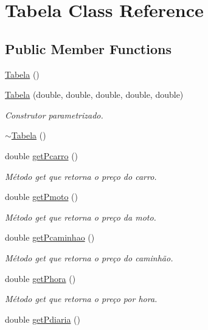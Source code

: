 \hypertarget{classTabela}{}\section{Tabela Class Reference}
\label{classTabela}
\subsection*{Public Member Functions}
\begin{DoxyCompactItemize}
\item 
\hyperlink{classTabela_ae631691131af52919f4b2e8bb823fde6}{Tabela} ()
\item 
\hyperlink{classTabela_acfefae7145c115e4b6ed3537e0cc2e4b}{Tabela} (double, double, double, double, double)
\begin{DoxyCompactList}\small\item\em Construtor parametrizado. \end{DoxyCompactList}\item 
\hyperlink{classTabela_ad3008f053777567e9b57174b93cfb7e2}{$\sim$\+Tabela} ()
\item 
double \hyperlink{classTabela_af8df006567638a44fec8e0951b794c4b}{get\+Pcarro} ()
\begin{DoxyCompactList}\small\item\em Método get que retorna o preço do carro. \end{DoxyCompactList}\item 
double \hyperlink{classTabela_a6f65feced705027c6c4d695737e1f7f4}{get\+Pmoto} ()
\begin{DoxyCompactList}\small\item\em Método get que retorna o preço da moto. \end{DoxyCompactList}\item 
double \hyperlink{classTabela_a0167b9de146e9b60cc807912dd8a4652}{get\+Pcaminhao} ()
\begin{DoxyCompactList}\small\item\em Método get que retorna o preço do caminhão. \end{DoxyCompactList}\item 
double \hyperlink{classTabela_a888b02d9fb45421a2574161c3c83e6db}{get\+Phora} ()
\begin{DoxyCompactList}\small\item\em Método get que retorna o preço por hora. \end{DoxyCompactList}\item 
double \hyperlink{classTabela_a7b8a7868ae2097482d8c9c1755fce914}{get\+Pdiaria} ()

\end{DoxyCompactItemize}

